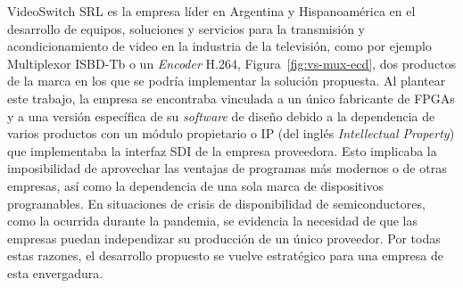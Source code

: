 VideoSwitch SRL \citep{vs-srl} es la empresa líder en Argentina y Hispanoamérica
en el desarrollo de equipos, soluciones y servicios para la transmisión y
acondicionamiento de video en la industria de la televisión, como por ejemplo
Multiplexor ISBD-Tb o un \textit{Encoder} H.264, Figura~\ref{fig:vs-mux-ecd},
dos productos de la marca en los que se podría implementar la solución propuesta.
Al plantear este trabajo, la empresa se encontraba vinculada a un único
fabricante de FPGAs y a una versión específica de su \textit{software} de
diseño debido a la dependencia de varios productos con un módulo propietario o
IP (del inglés \textit{Intellectual Property}) que implementaba la interfaz SDI
de la empresa proveedora. Esto implicaba la imposibilidad de aprovechar las
ventajas de programas más modernos o de otras empresas, así como la dependencia
de una sola marca de dispositivos programables. En situaciones de crisis de
disponibilidad de semiconductores, como la ocurrida durante la pandemia, se
evidencia la necesidad de que las empresas puedan independizar su producción de
un único proveedor. Por todas estas razones, el desarrollo propuesto se vuelve
estratégico para una empresa de esta envergadura.

